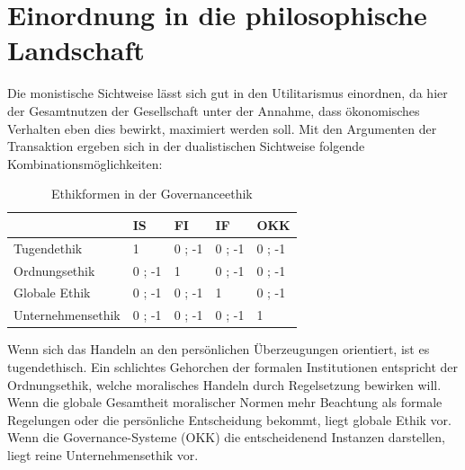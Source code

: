 \documentclass[12pt]{article}
\begin{document}
\section{Einordnung in die philosophische Landschaft}
Die monistische Sichtweise lässt sich gut in den Utilitarismus einordnen, da hier der Gesamtnutzen der Gesellschaft unter der Annahme, dass ökonomisches Verhalten eben dies bewirkt, maximiert werden soll. Mit den Argumenten der Transaktion ergeben sich in der dualistischen Sichtweise folgende Kombinationsmöglichkeiten:
\FloatBarrier
\begin{table}[ht!]
\begin{tabular}{|p{4cm}|p{2cm}|p{2cm}|p{2cm}|p{2cm}|}
\hline
 { } & IS & FI & IF & OKK\\\hline
 Tugendethik & 1 & 0 ; -1 & 0 ; -1 & 0 ; -1\\\hline
 Ordnungsethik & 0 ; -1 & 1 & 0 ; -1 & 0 ; -1\\\hline
 Globale Ethik & 0 ; -1 & 0 ; -1 & 1 & 0 ; -1\\\hline
 Unternehmensethik & 0 ; -1 & 0 ; -1 & 0 ; -1 & 1\\\hline
\end{tabular}
\caption{Ethikformen in der Governanceethik}
\end{table}
\FloatBarrier
\noindent Wenn sich das Handeln an den persönlichen Überzeugungen orientiert, ist es tugendethisch. Ein schlichtes Gehorchen der formalen Institutionen entspricht der Ordnungsethik, welche moralisches Handeln durch Regelsetzung bewirken will. Wenn die globale Gesamtheit moralischer Normen mehr Beachtung als formale Regelungen oder die persönliche Entscheidung bekommt, liegt globale Ethik vor. Wenn die Governance-Systeme (OKK) die entscheidenend Instanzen darstellen, liegt reine Unternehmensethik vor.\\[10pt]
\end{document}
